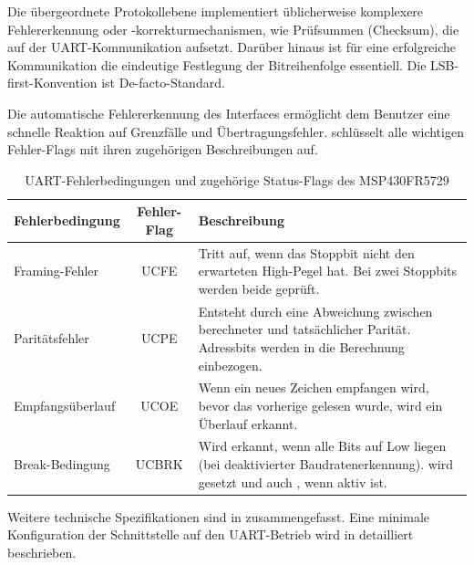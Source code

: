 Die \"ubergeordnete Protokollebene implementiert \"ublicherweise komplexere Fehlererkennung oder -korrekturmechanismen, wie \zB Pr\"ufsummen (Checksum), die auf der UART-Kommunikation aufsetzt. Dar\"uber hinaus ist f\"ur eine erfolgreiche Kommunikation die eindeutige Festlegung der Bitreihenfolge essentiell. Die LSB-first-Konvention ist De-facto-Standard. 

Die automatische Fehlererkennung des Interfaces erm\"oglicht dem Benutzer eine schnelle Reaktion auf Grenzf\"alle und \"Ubertragungsfehler.  schl\"usselt alle wichtigen Fehler-Flags mit ihren zugeh\"origen Beschreibungen auf.

\vspace{1cm}
\begin{table}[h!]
	\small
	\centering
	\begin{tabular}{|l|c|p{8.5cm}|}
		\hline
		\textbf{Fehlerbedingung} & \textbf{Fehler-Flag} & \textbf{Beschreibung} \\
		\hline
		Framing-Fehler & UCFE & Tritt auf, wenn das Stoppbit nicht den erwarteten High-Pegel hat. Bei zwei Stoppbits werden beide gepr\"uft.\\\hline
		Parit\"atsfehler & UCPE & Entsteht durch eine Abweichung zwischen berechneter und tats\"achlicher Parit\"at. Adressbits werden in die Berechnung einbezogen.\\\hline
		Empfangs\"uberlauf & UCOE & Wenn ein neues Zeichen empfangen wird, bevor das vorherige gelesen wurde, wird ein \"Uberlauf erkannt.\\\hline
		Break-Bedingung & UCBRK & Wird erkannt, wenn alle Bits auf Low liegen (bei deaktivierter Baudratenerkennung). \Code{UCBRK} wird gesetzt und \ggf auch \Code{UCRXIFG}, wenn \Code{UCBRKIE} aktiv ist. \\\hline
	\end{tabular}
	\caption{UART-Fehlerbedingungen und zugeh\"orige Status-Flags des MSP430FR5729\\}
	\label{tab:uart_error_flags}
\end{table}

\newpage
Weitere technische Spezifikationen sind in  zusammengefasst. Eine minimale Konfiguration der Schnittstelle auf den UART-Betrieb wird in  detailliert beschrieben.


